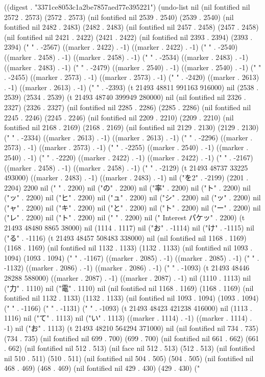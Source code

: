 
((digest . "3371ce8053c1a2be7857aed77e395221") (undo-list nil (nil fontified nil 2572 . 2573) (2572 . 2573) (nil fontified nil 2539 . 2540) (2539 . 2540) (nil fontified nil 2482 . 2483) (2482 . 2483) (nil fontified nil 2457 . 2458) (2457 . 2458) (nil fontified nil 2421 . 2422) (2421 . 2422) (nil fontified nil 2393 . 2394) (2393 . 2394) ("
" . -2567) ((marker . 2422) . -1) ((marker . 2422) . -1) ("
" . -2540) ((marker . 2458) . -1) ((marker . 2458) . -1) ("
" . -2534) ((marker . 2483) . -1) ((marker . 2483) . -1) ("
" . -2479) ((marker . 2540) . -1) ((marker . 2540) . -1) ("
" . -2455) ((marker . 2573) . -1) ((marker . 2573) . -1) ("
" . -2420) ((marker . 2613) . -1) ((marker . 2613) . -1) ("
" . -2393) (t 21493 48811 991163 916000) nil (2538 . 2539) (2534 . 2539) (t 21493 48740 399949 280000) nil (nil fontified nil 2326 . 2327) (2326 . 2327) (nil fontified nil 2285 . 2286) (2285 . 2286) (nil fontified nil 2245 . 2246) (2245 . 2246) (nil fontified nil 2209 . 2210) (2209 . 2210) (nil fontified nil 2168 . 2169) (2168 . 2169) (nil fontified nil 2129 . 2130) (2129 . 2130) ("
" . -2334) ((marker . 2613) . -1) ((marker . 2613) . -1) ("
" . -2296) ((marker . 2573) . -1) ((marker . 2573) . -1) ("
" . -2255) ((marker . 2540) . -1) ((marker . 2540) . -1) ("
" . -2220) ((marker . 2422) . -1) ((marker . 2422) . -1) ("
" . -2167) ((marker . 2458) . -1) ((marker . 2458) . -1) ("
" . -2129) (t 21493 48737 33225 493000) ((marker . 2483) . -1) ((marker . 2483) . -1) nil ("を2" . -2199) (2201 . 2204) 2200 nil (" " . 2200) nil ("の" . 2200) nil ("率" . 2200) nil ("ト" . 2200) nil ("ッ" . 2200) nil ("ヒ" . 2200) nil ("ュ" . 2200) nil ("シ" . 2200) nil ("ッ" . 2200) nil ("ャ" . 2200) nil ("キ" . 2200) nil ("と" . 2200) nil ("ト" . 2200) nil ("ー" . 2200) nil ("レ" . 2200) nil ("ト" . 2200) nil ("
" . 2200) nil (" Interest パケッ" . 2200) (t 21493 48480 8865 38000) nil (1114 . 1117) nil ("お" . -1114) nil ("け" . -1115) nil ("る" . -1116) (t 21493 48457 508483 338000) nil (nil fontified nil 1168 . 1169) (1168 . 1169) (nil fontified nil 1132 . 1133) (1132 . 1133) (nil fontified nil 1093 . 1094) (1093 . 1094) ("
" . -1167) ((marker . 2085) . -1) ((marker . 2085) . -1) ("
" . -1132) ((marker . 2086) . -1) ((marker . 2086) . -1) ("
" . -1093) (t 21493 48446 28288 588000) ((marker . 2087) . -1) ((marker . 2087) . -1) nil (1110 . 1113) nil ("力" . 1110) nil ("電" . 1110) nil (nil fontified nil 1168 . 1169) (1168 . 1169) (nil fontified nil 1132 . 1133) (1132 . 1133) (nil fontified nil 1093 . 1094) (1093 . 1094) ("
" . -1166) ("
" . -1131) ("
" . -1093) (t 21493 48423 421238 416000) nil (1113 . 1116) nil ("て" . 1113) nil ("い" . 1113) ((marker . 1114) . -1) ((marker . 1114) . -1) nil ("お" . 1113) (t 21493 48210 564294 371000) nil (nil fontified nil 734 . 735) (734 . 735) (nil fontified nil 699 . 700) (699 . 700) (nil fontified nil 661 . 662) (661 . 662) (nil fontified nil 512 . 513) (nil face nil 512 . 513) (512 . 513) (nil fontified nil 510 . 511) (510 . 511) (nil fontified nil 504 . 505) (504 . 505) (nil fontified nil 468 . 469) (468 . 469) (nil fontified nil 429 . 430) (429 . 430) ("
